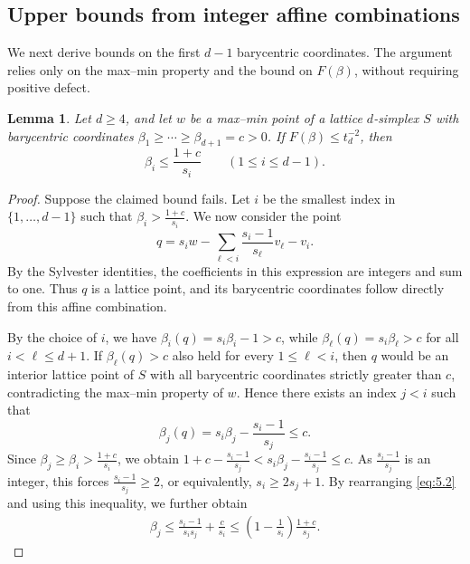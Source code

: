 \documentclass[reqno, 11pt]{article}
\numberwithin{equation}{section}
\newtheorem{lemma}[lemma]{Lemma}
\theoremstyle{definition}
\begin{document}
\subsection{Upper bounds from integer affine combinations}\label{sec:orbits}


We next derive bounds on the first $d-1$ barycentric coordinates. The argument relies only on the max--min property and the bound on $F(\beta)$, without requiring positive defect.

\begin{lemma}\label{orb:lem:localization}
Let $d\ge4$, and let $w$ be a max--min point of a lattice $d$-simplex $S$ with barycentric coordinates
$\beta_1\ge\cdots\ge\beta_{d+1}=c>0$.
If $F(\beta)\le t_d^{-2}$, then
\[
\beta_i\le\frac{1+c}{s_i}
\qquad(1\le i\le d-1).
\]
\end{lemma}
\begin{proof}
Suppose the claimed bound fails. Let $i$ be the smallest index in $\{1,\ldots,d-1\}$ such that $\beta_i>\frac{1+c}{s_i}$. We now consider the point
\[
q=s_iw-\sum_{\ell<i}\frac{s_i-1}{s_\ell}v_\ell-v_i.
\]
By the Sylvester identities, the coefficients in this
expression are integers and sum to one. Thus $q$ is a
lattice point, and its barycentric coordinates follow
directly from this affine combination.

By the choice of $i$, we have $\beta_i(q)=s_i\beta_i-1>c$,
while $\beta_\ell(q)=s_i\beta_\ell>c$ for all $i<\ell\le d+1$. If $\beta_\ell(q)>c$ also held for every $1\le\ell<i$, then $q$ would be an interior lattice point of $S$ with all barycentric coordinates strictly greater than $c$, contradicting the max--min property of $w$. Hence there exists an index $j<i$ such that
\begin{equation}\label{eq:5.2}
\beta_j(q)=s_i\beta_j-\frac{s_i-1}{s_j}\le c.
\end{equation}
Since $\beta_j\ge\beta_i>\frac{1+c}{s_i}$, we obtain
$
1+c-\frac{s_i-1}{s_j}
<s_i\beta_j-\frac{s_i-1}{s_j}\le c.
$
As $\frac{s_i-1}{s_j}$ is an integer, this forces $\frac{s_i-1}{s_j}\ge2$, or equivalently, $s_i\ge2s_j+1$.
By rearranging \eqref{eq:5.2} and using this inequality, we further obtain
\begin{align}\label{eq:5.2-betajwithbj}
\beta_j
\le\frac{s_i-1}{s_is_j}+\frac{c}{s_i}
\le\left(1-\frac1{s_i}\right)\frac{1+c}{s_j}.
\end{align}


\end{proof}
\end{document}

